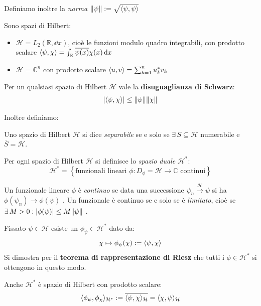 Definiamo inoltre la \textit{norma} \(\norm{\psi}: = \sqrt{\langle \psi, \psi \rangle }\)

\begin{example}
    Sono spazi di Hilbert:
    \begin{itemize}
        \item \(\mathcal{H}= L_2(\mathbb{R},\dd{x})\), cioè le funzioni modulo quadro integrabili, con prodotto scalare \(\langle \psi, \chi \rangle= \int_{\mathbb{R}} \overline{\psi(x)}\chi(x)\dd{x}\)
        \item \(\mathcal{H}= \mathbb{C}^n\) con prodotto scalare \(\langle u, v \rangle= \sum_{k=1}^{n} u_k^* v_k\)
    \end{itemize}
\end{example}

Per un qualsiasi spazio di Hilbert \(\mathcal{H}\) vale la \textbf{disuguaglianza di Schwarz}:
\begin{equation}
    \abs{\langle \psi, \chi \rangle}\leq \norm{\psi}\norm{\chi}
\end{equation}

Inoltre definiamo:
\begin{definition}
    Uno spazio di Hilbert \(\mathcal{H}\) si dice \textit{separabile} se e solo se \(\exists \, S \subseteq \mathcal{H}\) numerabile e \(\overline{S}= \mathcal{H}\).
\end{definition}
\begin{definition}
    Per ogni spazio di Hilbert \(\mathcal{H}\) si definisce lo \textit{spazio duale} \(\mathcal{H}^* \):
    \[
    \mathcal{H}^*= \left\{ \text{funzionali lineari }\phi: D_\phi = \mathcal{H}\to \mathbb{C} \text{ continui}\right\}
    \]
\end{definition}
\begin{definition}
    Un funzionale lineare \(\phi\) è \textit{continuo} se data una successione \(\psi_n \overset{\mathcal{H}}{\to} \psi\) si ha \(\phi(\psi_n)\to \phi(\psi)\) .
    Un funzionale è continuo se e solo se è \textit{limitato}, cioè se \(\exists\, M> 0 : \abs{\phi(\psi)} \leq M \norm{\psi}\) .
\end{definition}


\begin{example}
    Fissato \(\psi\in \mathcal{H}\) esiste un \(\phi_\psi \in \mathcal{H}^*\) dato da:
    \begin{equation}
        \chi\mapsto \phi_\psi(\chi):= \langle \psi, \chi \rangle
    \end{equation}
    Si dimostra per il \textbf{teorema di rappresentazione di Riesz} che tutti i \(\phi \in \mathcal{H}^*\) si ottengono in questo modo.

    \begin{remark}
        Anche \(\mathcal{H}^*\) è spazio di Hilbert con prodotto scalare:
        \[
        \langle \phi_\psi, \phi_\chi \rangle_{\mathcal{H}^*}:= \overline{\langle \psi, \chi \rangle_\mathcal{H}}= \langle \chi, \psi \rangle_\mathcal{H}
        \]
    \end{remark}
\end{example}


